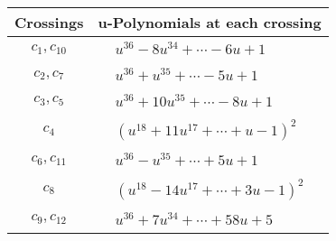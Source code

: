 \documentclass[1p]{elsarticle_modified}
\theoremstyle{definition}
\begin{document}
\begin{tabular}{m{50pt}|m{274pt}}
Crossings & \hspace{64pt}u-Polynomials at each crossing \\
\hline $$\begin{aligned}c_{1},c_{10}\end{aligned}$$&$\begin{aligned}
&u^{36}-8 u^{34}+\cdots-6 u+1
\end{aligned}$\\
\hline $$\begin{aligned}c_{2},c_{7}\end{aligned}$$&$\begin{aligned}
&u^{36}+u^{35}+\cdots-5 u+1
\end{aligned}$\\
\hline $$\begin{aligned}c_{3},c_{5}\end{aligned}$$&$\begin{aligned}
&u^{36}+10 u^{35}+\cdots-8 u+1
\end{aligned}$\\
\hline $$\begin{aligned}c_{4}\end{aligned}$$&$\begin{aligned}
&(u^{18}+11 u^{17}+\cdots+u-1)^{2}
\end{aligned}$\\
\hline $$\begin{aligned}c_{6},c_{11}\end{aligned}$$&$\begin{aligned}
&u^{36}- u^{35}+\cdots+5 u+1
\end{aligned}$\\
\hline $$\begin{aligned}c_{8}\end{aligned}$$&$\begin{aligned}
&(u^{18}-14 u^{17}+\cdots+3 u-1)^{2}
\end{aligned}$\\
\hline $$\begin{aligned}c_{9},c_{12}\end{aligned}$$&$\begin{aligned}
&u^{36}+7 u^{34}+\cdots+58 u+5
\end{aligned}$\\
\hline
\end{tabular}\\~\\
\newpage\renewcommand{\arraystretch}{1}
\end{document}
